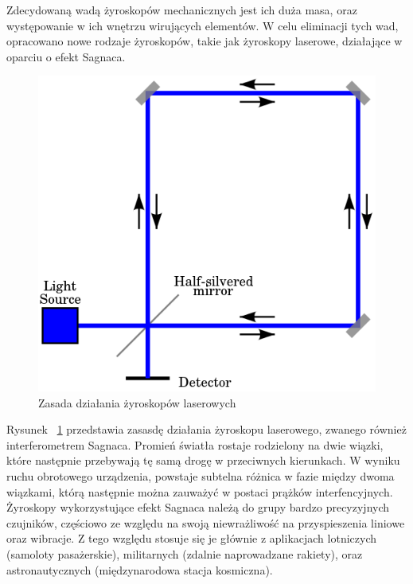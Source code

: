 Zdecydowaną wadą żyroskopów mechanicznych jest ich duża masa, oraz występowanie w ich wnętrzu wirujących elementów. W celu eliminacji tych wad, opracowano nowe rodzaje żyroskopów, takie jak żyroskopy laserowe, działające w oparciu o efekt Sagnaca.

\begin{figure}[H]
	\centering
	\includegraphics[scale=0.4]{Pictures/Sagnac_interferometer.png}
        \caption[Zasada działania żyroskopów laserowych]{Zasada działania żyroskopów laserowych}
        \label{fig:300px-SagnacPhase}
\end{figure}

Rysunek ~\ref{fig:300px-SagnacPhase} przedstawia zasasdę działania żyroskopu laserowego, zwanego również interferometrem Sagnaca. Promień światła rostaje rodzielony na dwie wiązki, które następnie przebywają tę samą drogę w przeciwnych kierunkach. W wyniku ruchu obrotowego urządzenia, powstaje subtelna różnica w fazie między dwoma wiązkami, którą następnie można zauważyć w postaci prążków interfencyjnych. Żyroskopy wykorzystujące efekt Sagnaca należą do grupy bardzo precyzyjnych czujników, częściowo ze względu na swoją niewrażliwość na przyspieszenia liniowe oraz wibracje. Z tego względu stosuje się je głównie z aplikacjach lotniczych (samoloty pasażerskie), militarnych (zdalnie naprowadzane rakiety), oraz astronautycznych (międzynarodowa stacja kosmiczna). 

